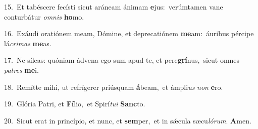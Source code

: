 {\numbfont\textcolor{\numbcolor}{15.}}~Et tabéscere fecísti sicut aráneam ánimam \textbf{e}\-jus:~\star verúmtamen vane conturbátur \textit{om}\-\textit{nis} \textbf{ho}\-mo.\par
{\numbfont\textcolor{\numbcolor}{16.}}~Exáudi oratiónem meam, Dómine, et deprecatiónem \textbf{me}\-am:~\star áuribus pércipe lá\-\textit{cri}\-\textit{mas} \textbf{me}\-as.\par
{\numbfont\textcolor{\numbcolor}{17.}}~Ne síleas: quóniam ádvena ego sum apud te, et pere\-\textbf{grí}\-nus,~\star sicut omnes \textit{pa}\-\textit{tres} \textbf{me}\-i.\par
{\numbfont\textcolor{\numbcolor}{18.}}~Remítte mihi, ut refrígerer priúsquam \textbf{á}\-beam,~\star et ámpli\textit{us} \textit{non} \textbf{e}\-ro.\par
{\numbfont\textcolor{\numbcolor}{19.}}~Glória Patri, et \textbf{Fí}\-lio,~\star et Spirí\-\textit{tu}\-\textit{i} \textbf{Sanc}\-to.\par
{\numbfont\textcolor{\numbcolor}{20.}}~Sicut erat in princípio, et nunc, et \textbf{sem}\-per,~\star et in sǽcula sæcu\-\textit{ló}\-\textit{rum}. \textbf{A}\-men.\par
